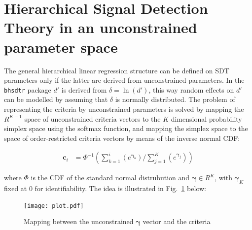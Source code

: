 \documentclass[oneside,a4paper]{article}
\begin{document}
\section{Hierarchical Signal Detection Theory in an unconstrained
  parameter space}

The general hierarchical linear regression structure can be defined on
SDT parameters only if the latter are derived from unconstrained
parameters. In the \texttt{bhsdtr} package $d'$ is derived from
$\delta = \ln(d')$, this way random effects on $d'$ can be modelled by
assuming that $\delta$ is normally distributed. The problem of
representing the criteria by unconstrained parameters
is solved by mapping the $R^{K-1}$ space of unconstrained criteria
vectors to the $K$ dimensional probability simplex space using the
softmax function, and mapping the simplex space to the space of
order-restricted criteria vectors by means of the inverse normal CDF:

\begin{align}
  \bm{c}_i &= \Phi^{-1}(\sum_{k = 1}^i(e^{\bm{\gamma}_k}) /
             \sum_{j=1}^K(e^{\bm{\gamma}_j}))
\label{eq:1}
\end{align}

\noindent where $\Phi$ is the CDF of the standard normal distrubution
and $\bm{\gamma} \in R^K$, with $\bm{\gamma}_K$ fixed at $0$ for
identifiability. The idea is illustrated in Fig.~\ref{fig:2} below:

\begin{figure}[H]
  \centering
  \texttt{[image: plot.pdf]}
  \caption{Mapping between the unconstrained $\bm{\gamma}$ vector and
    the criteria}
  \label{fig:2}
\end{figure}
\end{document}
